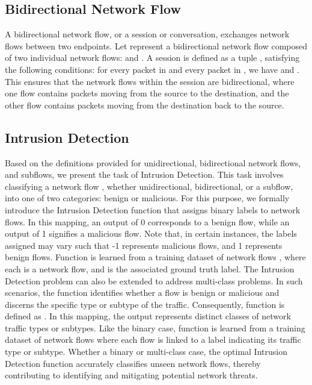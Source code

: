 \documentclass[lettersize,journal]{IEEEtran}
\begin{document}
\subsection{Bidirectional Network Flow}\label{sec:bidirectional_flow}
A bidirectional network flow, or a session or conversation, exchanges network flows between two endpoints. Let  represent a bidirectional network flow composed of two individual network flows:  and . A session  is defined as a tuple , satisfying the following conditions: for every packet  in  and every packet  in , we have  and . This ensures that the network flows within the session are bidirectional, where one flow contains packets moving from the source to the destination, and the other flow contains packets moving from the destination back to the source.
 
\subsection{Intrusion Detection} 
Based on the definitions provided for unidirectional, bidirectional network flows, and subflows, we present the task of Intrusion Detection. This task involves classifying a network flow , whether unidirectional, bidirectional, or a subflow, into one of two categories: benign or malicious. For this purpose, we formally introduce the Intrusion Detection function  that assigns binary labels to network flows. In this mapping, an output of 0 corresponds to a benign flow, while an output of 1 signifies a malicious flow. Note that, in certain instances, the labels assigned may vary such that -1 represents malicious flows, and 1 represents benign flows. Function  is learned from a training dataset of network flows , where each  is a network flow, and  is the associated ground truth label. The Intrusion Detection problem can also be extended to address multi-class problems. In such scenarios, the function  identifies whether a flow is benign or malicious and discerns the specific type or subtype of the traffic. Consequently, function  is defined as . In this mapping, the output  represents  distinct classes of network traffic types or subtypes. Like the binary case, function  is learned from a training dataset of network flows where each flow is linked to a label indicating its traffic type or subtype. Whether a binary or multi-class case, the optimal Intrusion Detection function accurately classifies unseen network flows, thereby contributing to identifying and mitigating potential network threats.
 
\end{document}
